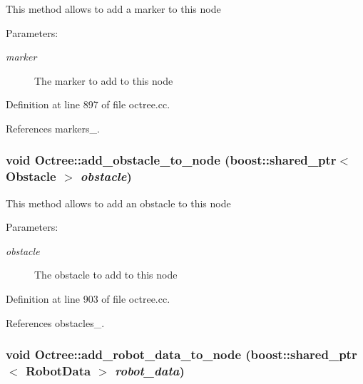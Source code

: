 This method allows to add a marker to this node

\begin{Desc}
\item[Parameters:]
\begin{description}
\item[{\em marker}]The marker to add to this node \end{description}
\end{Desc}


Definition at line 897 of file octree.cc.

References markers\_\-.\hypertarget{class_octree_bf82f696a0f350ad2eae35431e971a66}{
\subsubsection[add\_\-obstacle\_\-to\_\-node]{\setlength{\rightskip}{0pt plus 5cm}void Octree::add\_\-obstacle\_\-to\_\-node (boost::shared\_\-ptr$<$ Obstacle $>$ {\em obstacle})}}
\label{class_octree_bf82f696a0f350ad2eae35431e971a66}


This method allows to add an obstacle to this node

\begin{Desc}
\item[Parameters:]
\begin{description}
\item[{\em obstacle}]The obstacle to add to this node \end{description}
\end{Desc}


Definition at line 903 of file octree.cc.

References obstacles\_\-.\hypertarget{class_octree_c09b4c93c005fd24b6feb35147d6cfd1}{
\subsubsection[add\_\-robot\_\-data\_\-to\_\-node]{\setlength{\rightskip}{0pt plus 5cm}void Octree::add\_\-robot\_\-data\_\-to\_\-node (boost::shared\_\-ptr$<$ {\bf RobotData} $>$ {\em robot\_\-data})}}
\label{class_octree_c09b4c93c005fd24b6feb35147d6cfd1}


